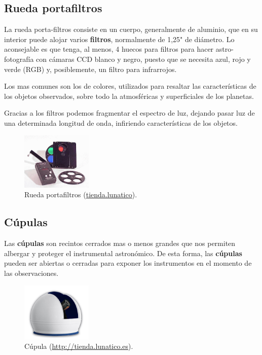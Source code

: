 \subsection{Rueda portafiltros}

La rueda porta-filtros consiste en un cuerpo, generalmente de aluminio, que en su interior puede alojar varios \textbf{filtros}, normalmente de 1,25" de diámetro. Lo aconsejable es que tenga, al menos, 4 huecos para filtros para hacer astro-fotografía con cámaras CCD blanco y negro, puesto que se necesita  azul, rojo y verde (RGB) y, posiblemente, un filtro para infrarrojos.

\bigskip
Los mas comunes son los de colores, utilizados para resaltar las características de los objetos observados, sobre todo la atmosféricas y superficiales de los planetas.

\bigskip
Gracias a los filtros podemos fragmentar el espectro de luz, dejando pasar luz de una determinada longitud de onda, infiriendo características de los objetos.


\bigskip
\begin{figure}[!ht]
	\begin{center}
		\includegraphics[width=0.3\textwidth]{../images/portafiltros.jpg}
		\caption[Rueda portafiltros]{Rueda portafiltros (\href{https://astroimagen.wordpress.com/productos/optec/ruedas-de-filtros-ifw/}{tienda.lunatico}).}
		\label{fig:portaf}
	\end{center}
\end{figure}



\subsection{Cúpulas}
Las \textbf{cúpulas} son recintos cerrados mas o menos grandes que nos permiten albergar y proteger el instrumental astronómico. De esta forma, las \textbf{cúpulas} pueden ser abiertas o cerradas para exponer los instrumentos en el momento de las observaciones.

\bigskip
\begin{figure}[!ht]
	\begin{center}
		\includegraphics[width=0.3\textwidth]{../images/cupula.jpg}
		\caption[Cúpula]{Cúpula (\href{http://tienda.lunatico.es}{http://tienda.lunatico.es}).}
		\label{fig:diag_scrum}
	\end{center}
\end{figure}


